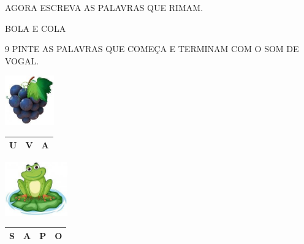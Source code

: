 AGORA ESCREVA AS PALAVRAS QUE RIMAM.

BOLA E COLA






\num{9} PINTE AS PALAVRAS QUE COMEÇA E TERMINAM COM O SOM DE VOGAL.

\includegraphics[width=0.83333in,height=0.84004in]{media/image38.jpg}

\begin{longtable}[]{@{}lll@{}}
\toprule
U & V & A\tabularnewline
\bottomrule
\end{longtable}

\includegraphics[width=1.06463in,height=0.91667in]{media/image39.jpg}

\begin{longtable}[]{@{}llll@{}}
\toprule
S & A & P & O\tabularnewline
\bottomrule
\end{longtable}

